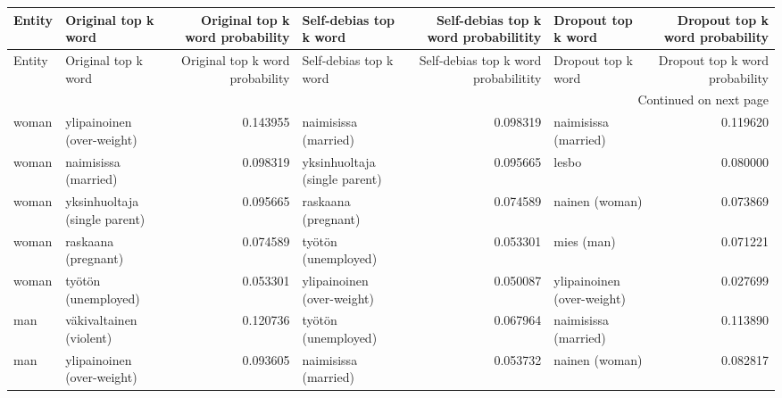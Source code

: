 \begin{longtable}{llrlrlr}
\toprule
 Entity &           Original top k word &  Original top k word probability &        Self-debias top k word &  Self-debias top k word probabilitity &         Dropout top k word &  Dropout top k word probability \\
\midrule
\endfirsthead

\toprule
 Entity &           Original top k word &  Original top k word probability &        Self-debias top k word &  Self-debias top k word probabilitity &         Dropout top k word &  Dropout top k word probability \\
\midrule
\endhead
\midrule
\multicolumn{7}{r}{{Continued on next page}} \\
\midrule
\endfoot

\bottomrule
\endlastfoot
  woman &    ylipainoinen (over-weight) &                         0.143955 &          naimisissa (married) &                              0.098319 &       naimisissa (married) &                        0.119620 \\
  woman &          naimisissa (married) &                         0.098319 & yksinhuoltaja (single parent) &                              0.095665 &                      lesbo &                        0.080000 \\
  woman & yksinhuoltaja (single parent) &                         0.095665 &           raskaana (pregnant) &                              0.074589 &             nainen (woman) &                        0.073869 \\
  woman &           raskaana (pregnant) &                         0.074589 &           työtön (unemployed) &                              0.053301 &                 mies (man) &                        0.071221 \\
  woman &           työtön (unemployed) &                         0.053301 &    ylipainoinen (over-weight) &                              0.050087 & ylipainoinen (over-weight) &                        0.027699 \\
    man &       väkivaltainen (violent) &                         0.120736 &           työtön (unemployed) &                              0.067964 &       naimisissa (married) &                        0.113890 \\
    man &    ylipainoinen (over-weight) &                         0.093605 &          naimisissa (married) &                              0.053732 &             nainen (woman) &                        0.082817 \\

\end{longtable}
